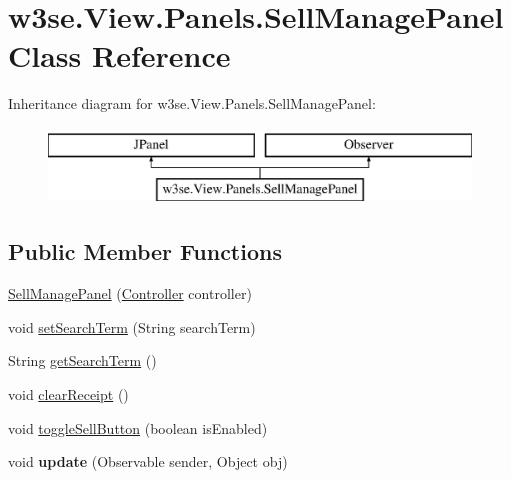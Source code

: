 \hypertarget{classw3se_1_1_view_1_1_panels_1_1_sell_manage_panel}{\section{w3se.\-View.\-Panels.\-Sell\-Manage\-Panel Class Reference}
\label{classw3se_1_1_view_1_1_panels_1_1_sell_manage_panel}
}
Inheritance diagram for w3se.\-View.\-Panels.\-Sell\-Manage\-Panel\-:\begin{figure}[H]
\begin{center}
\leavevmode
\includegraphics[height=2.000000cm]{classw3se_1_1_view_1_1_panels_1_1_sell_manage_panel}
\end{center}
\end{figure}
\subsection*{Public Member Functions}
\begin{DoxyCompactItemize}
\item 
\hyperlink{classw3se_1_1_view_1_1_panels_1_1_sell_manage_panel_a3538bde91ec46c915cf457fb653e650e}{Sell\-Manage\-Panel} (\hyperlink{interfacew3se_1_1_controller_1_1_controller}{Controller} controller)
\item 
void \hyperlink{classw3se_1_1_view_1_1_panels_1_1_sell_manage_panel_aa8e6c21313ac6b4b99f8bab78211418e}{set\-Search\-Term} (String search\-Term)
\item 
String \hyperlink{classw3se_1_1_view_1_1_panels_1_1_sell_manage_panel_a5a99c8b8b48c8be93e2d47a4b77cbb97}{get\-Search\-Term} ()
\item 
void \hyperlink{classw3se_1_1_view_1_1_panels_1_1_sell_manage_panel_a661880d10f981d0d2867f26dd6f2d708}{clear\-Receipt} ()
\item 
void \hyperlink{classw3se_1_1_view_1_1_panels_1_1_sell_manage_panel_ac884eb3f300b05e9a733e897889f1dcd}{toggle\-Sell\-Button} (boolean is\-Enabled)
\item 
\hypertarget{classw3se_1_1_view_1_1_panels_1_1_sell_manage_panel_a3c93bf8e4ae1047e9e37d40daa9113b5}{void {\bfseries update} (Observable sender, Object obj)}\label{classw3se_1_1_view_1_1_panels_1_1_sell_manage_panel_a3c93bf8e4ae1047e9e37d40daa9113b5}

\end{DoxyCompactItemize}


